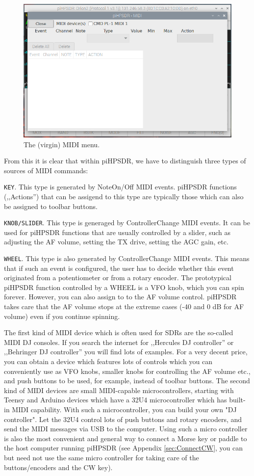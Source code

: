 \documentclass[12pt]{book}
\def\rett#1{\texttt{\color{red}#1}}
\begin{document}
\begin{figure}[ht]
\center
\includegraphics[width=12cm]{MIDImenu1.png}
\caption{The (virgin) MIDI menu.}
\label{fig:MIDImenu1}
\end{figure}

From this it is clear that within piHPSDR, we have to distinguish three types of sources
of MIDI commands:

\rett{KEY}. This type is generated by NoteOn/Off MIDI events. piHPSDR functions (,,Actions'') that
can be assigend to this type are typically those which can also be assigned to toolbar
buttons.

\rett{KNOB/SLIDER}. This type is generaged by ControllerChange MIDI events. It can be used
for piHPSDR functions that are usually controlled by a slider, such as adjusting the AF
volume, setting the TX drive, setting the AGC gain, etc.

\rett{WHEEL}. This type is also generated by ControllerChange MIDI events. This means
that if such an event is configured, the user has to decide whether this event
originated from a potentiometer or from a rotary encoder. The prototypical piHPSDR
function controlled by a WHEEL is a VFO knob, which you can spin forever. However,
you can also assign to to the AF volume control. piHPSDR takes care that the
AF volume stops at the extreme cases (-40 and 0 dB for AF volume) even if you continue
spinning.

The first kind of MIDI device which is often used for SDRs are the so-called MIDI DJ
consoles. If you search the internet for ,,Hercules DJ controller'' or ,,Behringer
DJ controller'' you will find lots of examples. For a very decent price, you
can obtain a device which features lots of controls which you can conveniently use
as VFO knobs, smaller knobs for controlling the AF volume etc., and push buttons
to be used, for example, instead of toolbar buttons. The second kind of MIDI devices
are small MIDI-capable microcontrollers, starting with Teensy and Arduino devices
which have a 32U4 microcontroller which has built-in MIDI capability. With such a
microcontroller, you can build your own "DJ controller". Let the 32U4 control
lots of push buttons and rotary encoders, and send the MIDI messages via USB to the
computer. Using such a micro controller is also the most convenient and general way
to connect a Morse key or paddle to the host computer running piHPSDR (see
Appendix \ref{sec:ConnectCW}, you can but need not use the same micro controller
for taking care of the buttons/encoders and the CW key).
\end{document}
